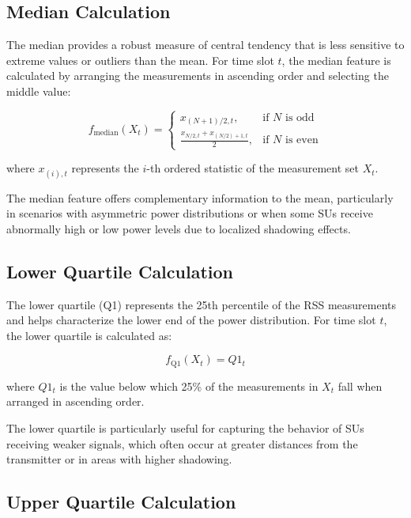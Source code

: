 \subsection{Median Calculation}

The median provides a robust measure of central tendency that is less sensitive to extreme values or outliers than the mean. For time slot $t$, the median feature is calculated by arranging the measurements in ascending order and selecting the middle value:

\begin{equation}
    f_{\text{median}}(X_t) = 
    \begin{cases}
        x_{(N+1)/2, t}, & \text{if $N$ is odd} \\
        \frac{x_{N/2, t} + x_{(N/2)+1, t}}{2}, & \text{if $N$ is even}
    \end{cases}
\end{equation}

where $x_{(i), t}$ represents the $i$-th ordered statistic of the measurement set $X_t$.

The median feature offers complementary information to the mean, particularly in scenarios with asymmetric power distributions or when some SUs receive abnormally high or low power levels due to localized shadowing effects.

\subsection{Lower Quartile Calculation}

The lower quartile (Q1) represents the 25th percentile of the RSS measurements and helps characterize the lower end of the power distribution. For time slot $t$, the lower quartile is calculated as:

\begin{equation}
    f_{\text{Q1}}(X_t) = Q1_t
\end{equation}

where $Q1_t$ is the value below which 25\% of the measurements in $X_t$ fall when arranged in ascending order.

The lower quartile is particularly useful for capturing the behavior of SUs receiving weaker signals, which often occur at greater distances from the transmitter or in areas with higher shadowing.

\subsection{Upper Quartile Calculation}

